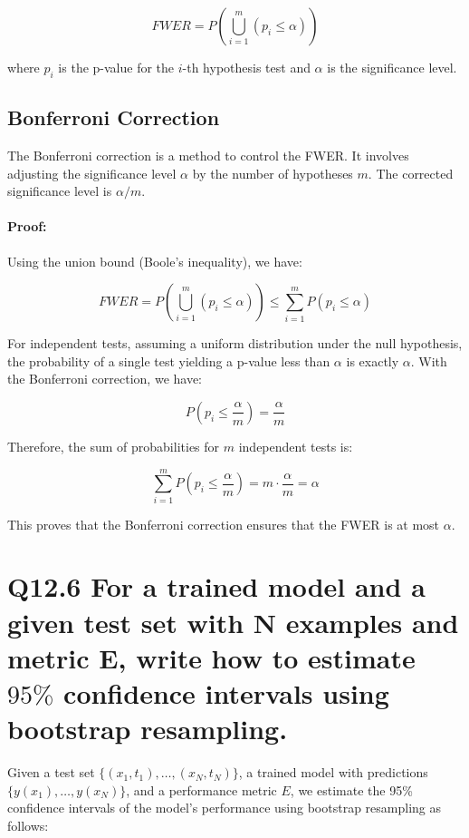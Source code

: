 \documentclass[11pt]{article}
\begin{document}
\[
FWER = P\left(\bigcup_{i=1}^{m} (p_i \leq \alpha)\right)
\]

where $p_i$ is the p-value for the $i$-th hypothesis test and $\alpha$ is the significance level.

\subsection*{Bonferroni Correction}

The Bonferroni correction is a method to control the FWER. It involves adjusting the significance level $\alpha$ by the number of hypotheses $m$. The corrected significance level is $\alpha/m$.

\paragraph{Proof:}

Using the union bound (Boole's inequality), we have:

\[
FWER = P\left(\bigcup_{i=1}^{m} (p_i \leq \alpha)\right) \leq \sum_{i=1}^{m} P(p_i \leq \alpha)
\]

For independent tests, assuming a uniform distribution under the null hypothesis, the probability of a single test yielding a p-value less than $\alpha$ is exactly $\alpha$. With the Bonferroni correction, we have:

\[
P(p_i \leq \frac{\alpha}{m}) = \frac{\alpha}{m}
\]

Therefore, the sum of probabilities for $m$ independent tests is:

\[
\sum_{i=1}^{m} P(p_i \leq \frac{\alpha}{m}) = m \cdot \frac{\alpha}{m} = \alpha
\]

This proves that the Bonferroni correction ensures that the FWER is at most $\alpha$.

\section{Q12.6 For a trained model and a given test set with N examples and metric E, write how to estimate $95\%$ confidence intervals using bootstrap resampling.}

Given a test set $\{ (x_1, t_1), \ldots, (x_N, t_N) \}$, a trained model with predictions $\{ y(x_1), \ldots, y(x_N) \}$, and a performance metric $E$, we estimate the 95\% confidence intervals of the model's performance using bootstrap resampling as follows:
\end{document}
